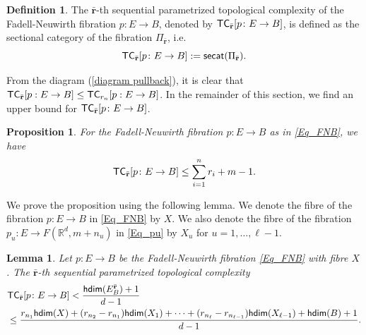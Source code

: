 \documentclass[12pt,oneside,reqno]{amsart}
\theoremstyle{plain}
\newtheorem{proposition}[theorem]{Proposition}
\newtheorem{lemma}[theorem]{Lemma}
\theoremstyle{definition}
\newtheorem{definition}[theorem]{Definition}
\theoremstyle{remark}
\newcommand{\hdim}{{\sf {hdim}}}
\newcommand{\secat}{{\sf {secat}}}
\newcommand{\TC}{{\sf {TC}}}
\newcommand{\br}{\bar{\mathbf{r}}}
\begin{document}
\begin{definition}
The $\bar{\textbf{r}}$-th sequential parametrized topological complexity of the Fadell-Neuwirth fibration $p\colon E\to B$, denoted by $\TC_{\bar{\textbf{r}}}[p \colon E \to B]$, is defined as the sectional category of the fibration $\Pi_{\bar{\textbf{r}}}$, i.e.
$$\TC_{\bar{\textbf{r}}}[p \colon E \to B] := \secat(\Pi_{\bar{\textbf{r}}}).$$
\end{definition}

\noindent From the diagram (\ref{diagram pullback}), it is clear that $\TC_{\br}[p: E \to B] \leq \TC_{r_n}[p: E \to B]$. In the remainder of this section, we find an upper bound for $\TC_{\br}[p \colon E \to B]$.

\begin{proposition}\label{Prop_ubptc}
For the Fadell-Neuwirth fibration $p\colon E \to B$ as in \eqref{Eq_FNB}, we have $$\TC_{\bar{\textbf{r}}}[p \colon E \to B] \leq \displaystyle\sum^{n}_{i=1} {r_i} + m -1.$$
\end{proposition}

We prove the proposition using the following lemma. We denote the fibre of the fibration $p \colon E \to B$ in \eqref{Eq_FNB} by $X$. We also denote the fibre of the fibration $p_u\colon E\to F(\mathbb{R}^d, m+n_u)$ in \eqref{Eq_pu} by $X_u$ for $u=1, \dots, \ell-1$.



\begin{lemma}\label{Lemma_general upper bound of TC}
Let $p\colon E \to B$ be the Fadell-Neuwirth fibration \eqref{Eq_FNB} with fibre $X$. The $\bar{\textbf{r}}$-th sequential parametrized topological complexity
\begin{align*}
& \TC_{\bar{\textbf{r}}}[p\colon E \to B]< \frac{\hdim (E^{\bar{\textbf{r}}}_B) + 1}{d-1} \\
& \leq \frac{ r_{n_1} \hdim (X) + (r_{n_2}-r_{n_1}) \hdim (X_1) + \cdots + (r_{n_\ell}-r_{n_{\ell-1}}) \hdim (X_{\ell-1}) + \hdim (B) + 1}{d-1}.
\end{align*}
\end{lemma}
\end{document}
